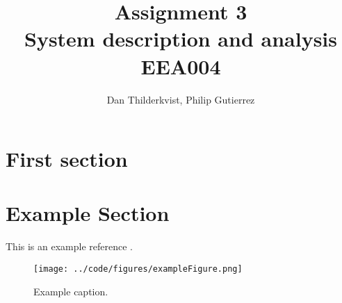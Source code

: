 \documentclass[a4paper, titlepage]{article}
\title{Assignment 3\\
System description and analysis\\
\large EEA004}
\author{Dan Thilderkvist, Philip Gutierrez}
\begin{document}
\maketitle

\section{First section}

\clearpage


\clearpage
\appendix

\section{Example Section}
This is an example reference \citep{glad00}.

\begin{figure}[h!]
\center
\texttt{[image: ../code/figures/exampleFigure.png]}
\caption{Example caption.}
\label{fig:exampleLable}
\end{figure}


\end{document}
